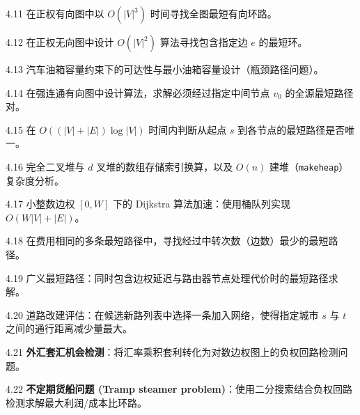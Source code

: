 \begin{exercise}{4.11}
在正权有向图中以 $O(|V|^3)$ 时间寻找全图最短有向环路。
\end{exercise}

\begin{exercise}{4.12}
在正权无向图中设计 $O(|V|^2)$ 算法寻找包含指定边 $e$ 的最短环。
\end{exercise}

\begin{exercise}{4.13}
汽车油箱容量约束下的可达性与最小油箱容量设计（瓶颈路径问题）。
\end{exercise}

\begin{exercise}{4.14}
在强连通有向图中设计算法，求解必须经过指定中间节点 $v_0$ 的全源最短路径对。
\end{exercise}

\begin{exercise}{4.15}
在 $O((|V| + |E|) \log |V|)$ 时间内判断从起点 $s$ 到各节点的最短路径是否唯一。
\end{exercise}

\begin{exercise}{4.16}
完全二叉堆与 $d$ 叉堆的数组存储索引换算，以及 $O(n)$ 建堆（\texttt{makeheap}）复杂度分析。
\end{exercise}

\begin{exercise}{4.17}
小整数边权 $[0, W]$ 下的 Dijkstra 算法加速：使用桶队列实现 $O(W|V| + |E|)$。
\end{exercise}

\begin{exercise}{4.18}
在费用相同的多条最短路径中，寻找经过中转次数（边数）最少的最短路径。
\end{exercise}

\begin{exercise}{4.19}
广义最短路径：同时包含边权延迟与路由器节点处理代价时的最短路径求解。
\end{exercise}

\begin{exercise}{4.20}
道路改建评估：在候选新路列表中选择一条加入网络，使得指定城市 $s$ 与 $t$ 之间的通行距离减少量最大。
\end{exercise}

\begin{exercise}{4.21}
\textbf{外汇套汇机会检测}：将汇率乘积套利转化为对数边权图上的负权回路检测问题。
\end{exercise}

\begin{exercise}{4.22}
\textbf{不定期货船问题 (Tramp steamer problem)}：使用二分搜索结合负权回路检测求解最大利润/成本比环路。
\end{exercise}

